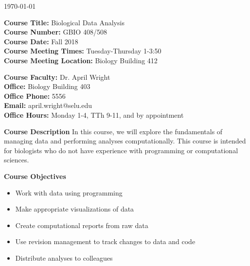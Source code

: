 \documentclass[12pt]{article}
\let\oldtextbf\textbf
\renewcommand{\textbf}[1]{\textcolor{coolblack}{\oldtextbf{#1}}}
\begin{document}
\thispagestyle{fancy}
\begin{flushright}
\today
\end{flushright}
\vspace{2mm}
\begin{flushleft}
\textbf{Course Title:} Biological Data Analysis \\
\textbf{Course Number:} GBIO 408/508\\


\textbf{Course Date:} Fall 2018 \\

\textbf{Course Meeting Times:} Tuesday-Thursday 1-3:50 \\
\textbf{Course Meeting Location:} Biology Building 412 \\
\end{flushleft}

\bigskip

\begin{flushleft}
\textbf{Course Faculty:} Dr. April Wright \\
\textbf{Office:} Biology Building 403\\
\textbf{Office Phone:} 5556 \\
\textbf{Email:} april.wright@selu.edu   \\
\textbf{Office Hours:} Monday 1-4, TTh 9-11, and by appointment \\

\end{flushleft}

\bigskip

\begin{flushleft}

\textbf{Course Description}
In this course, we will explore the fundamentals of managing data and performing analyses computationally. This course is intended for biologists who do not have experience with programming or computational sciences. 

\end{flushleft}

\bigskip
\begin{flushleft}

\textbf{Course Objectives}

\begin{itemize}

\item Work with data using programming
\item Make appropriate visualizations of data
\item Create computational reports from raw data
\item Use revision management to track changes to data and code
\item Distribute analyses to colleagues

\end{itemize}
\end{flushleft}
\end{document}
